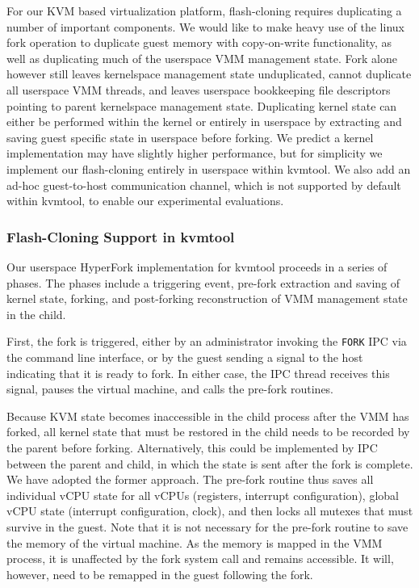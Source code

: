 For our KVM based virtualization platform, flash-cloning requires duplicating a
number of important components. We would like to make heavy use of the linux
fork operation to duplicate guest memory with copy-on-write functionality, as
well as duplicating much of the userspace VMM management state. Fork alone
however still leaves kernelspace management state unduplicated, cannot
duplicate all userspace VMM threads, and leaves userspace bookkeeping file
descriptors pointing to parent kernelspace management state. Duplicating kernel
state can either be performed within the kernel or entirely in userspace by
extracting and saving guest specific state in userspace before forking. We
predict a kernel implementation may have slightly higher performance, but for
simplicity we implement our flash-cloning entirely in userspace within kvmtool.
We also add an ad-hoc guest-to-host communication channel, which is not
supported by default within kvmtool, to enable our experimental evaluations.

\subsubsection{Flash-Cloning Support in kvmtool}

Our userspace HyperFork implementation for kvmtool proceeds in a series of
phases. The phases include a triggering event, pre-fork extraction and saving
of kernel state, forking, and post-forking reconstruction of VMM management
state in the child.

First, the fork is triggered, either by an administrator invoking the
\texttt{FORK} IPC via the command line interface, or by the guest sending a
signal to the host indicating that it is ready to fork. In either case, the IPC
thread receives this signal, pauses the virtual machine, and calls the pre-fork
routines.

Because KVM state becomes inaccessible in the child process after the VMM has
forked, all kernel state that must be restored in the child needs to be
recorded by the parent before forking. Alternatively, this could be implemented
by IPC between the parent and child, in which the state is sent after the fork
is complete. We have adopted the former approach. The pre-fork routine thus
saves all individual vCPU state for all vCPUs (registers, interrupt
configuration), global vCPU state (interrupt configuration, clock), and then
locks all mutexes that must survive in the guest. Note that it is not necessary
for the pre-fork routine to save the memory of the virtual machine. As the
memory is mapped in the VMM process, it is unaffected by the fork system call
and remains accessible. It will, however, need to be remapped in the guest
following the fork.


